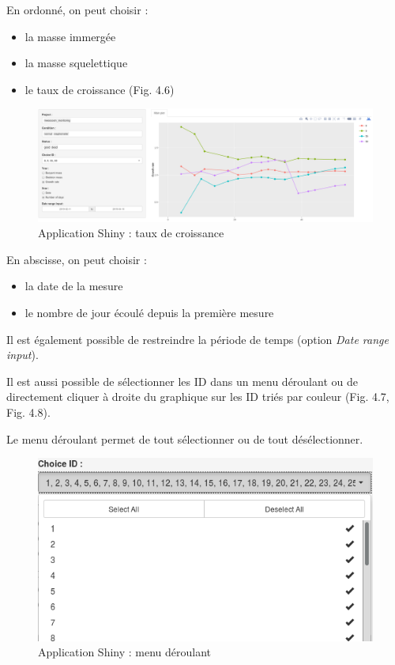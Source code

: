 \documentclass[]{report}
\providecommand{\tightlist}{%
  \setlength{\itemsep}{0pt}\setlength{\parskip}{0pt}}
\begin{document}
\vspace{0.5cm}

\null
\newpage

En ordonné, on peut choisir :

\begin{itemize}
\tightlist
\item
  la masse immergée
\item
  la masse squelettique
\item
  le taux de croissance (Fig. 4.6) 
\end{itemize}

\begin{figure}[h!]
\includegraphics[]{../image/taux-croissance.PNG}
\caption{Application Shiny : taux de croissance}
\end{figure}

En abscisse, on peut choisir :

\begin{itemize}
\tightlist
\item
  la date de la mesure
\item
  le nombre de jour écoulé depuis la première mesure
\end{itemize}

Il est également possible de restreindre la période de temps (option
\emph{Date range input}).

Il est aussi possible de sélectionner les ID dans un menu déroulant ou
de directement cliquer à droite du graphique sur les ID triés par
couleur (Fig. 4.7, Fig. 4.8).

Le menu déroulant permet de tout sélectionner ou de tout désélectionner.

\begin{figure}[h!]
\includegraphics[]{../image/menu-deroulant.PNG}
\caption{Application Shiny : menu déroulant}
\end{figure}
\end{document}

